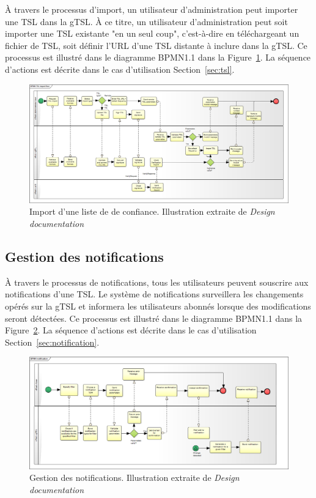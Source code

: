 \documentclass{tnreport}
\begin{document}
À travers le processus d'import, un utilisateur d'administration peut importer une TSL dans la gTSL. À ce titre, un utilisateur d'administration peut soit importer une TSL existante "en un seul coup", c'est-à-dire en téléchargeant un fichier de TSL, soit définir l'URL d'une TSL distante à inclure dans la gTSL. Ce processus est illustré dans le diagramme BPMN1.1 dans la Figure~\ref{fig:import-flow}. La séquence d'actions est décrite dans le cas d'utilisation Section~\ref{sec:tsl}.

\begin{figure}[h]
	\centering
	\includegraphics[scale=0.31]{figures/import-flow}
	\caption{Import d'une liste de de confiance. Illustration extraite de \textit{Design documentation}~\cite{design-document}}
	\label{fig:import-flow}
\end{figure}

\subsection{Gestion des notifications}

À travers le processus de notifications, tous les utilisateurs peuvent souscrire aux notifications d'une TSL. Le système de notifications surveillera les changements opérés sur la gTSL et informera les utilisateurs abonnés lorsque des modifications seront détectées. Ce processus est illustré dans le diagramme BPMN1.1 dans la Figure~\ref{fig:notification-flow}. La séquence d'actions est décrite dans le cas d'utilisation Section~\ref{sec:notification}.

\begin{figure}[h]
	\centering
	\includegraphics[scale=0.33]{figures/notification-flow}
	\caption{Gestion des notifications. Illustration extraite de \textit{Design documentation}~\cite{design-document}}
	\label{fig:notification-flow}
\end{figure}
\end{document}
